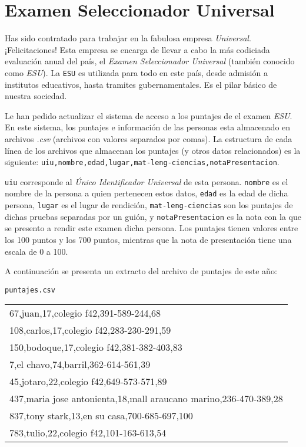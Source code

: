 \section{Examen Seleccionador Universal}

Has sido contratado para trabajar en la fabulosa empresa \textit{Universal}. ¡Felicitaciones! Esta empresa se encarga de llevar a cabo la más codiciada evaluación anual del país, el \textit{Examen Seleccionador Universal} (también conocido como \textit{ESU}). La \texttt{ESU} es utilizada para todo en este país, desde admisión a institutos educativos, hasta tramites gubernamentales. Es el pilar básico de nuestra sociedad.

Le han pedido actualizar el  sistema de acceso a los puntajes de el examen \textit{ESU}. En este sistema, los puntajes e información de las personas esta almacenado en archivos \textit{.csv} (archivos con valores separados por comas). La estructura de cada línea de los archivos que almacenan los puntajes (y otros datos relacionados) es la siguiente: \texttt{uiu,nombre,edad,lugar,mat-leng-ciencias,notaPresentacion}.

\texttt{uiu} corresponde al \textit{Único Identificador Universal} de esta persona. \texttt{nombre} es el nombre de la persona a quien pertenecen estos datos, \texttt{edad} es la edad de dicha persona, \texttt{lugar} es el lugar de rendición, \texttt{mat-leng-ciencias} son los puntajes de dichas pruebas separadas por un guión, y \texttt{notaPresentacion} es la nota con la que se presento a rendir este examen dicha persona. Los puntajes tienen valores entre los 100 puntos y los 700 puntos, mientras que la nota de presentación tiene una escala de 0 a 100.

A continuación se presenta un extracto del archivo de puntajes de este año:
\begin{center}
\texttt{puntajes.csv}\\
	\begin{tabular}{|l|}
		\hline
67,juan,17,colegio f42,391-589-244,68\\
108,carlos,17,colegio f42,283-230-291,59\\
150,bodoque,17,colegio f42,381-382-403,83\\
7,el chavo,74,barril,362-614-561,39\\
45,jotaro,22,colegio f42,649-573-571,89\\
437,maria jose antonienta,18,mall araucano marino,236-470-389,28\\
837,tony stark,13,en su casa,700-685-697,100\\
783,tulio,22,colegio f42,101-163-613,54\\
		\hline
	\end{tabular}
\end{center}

